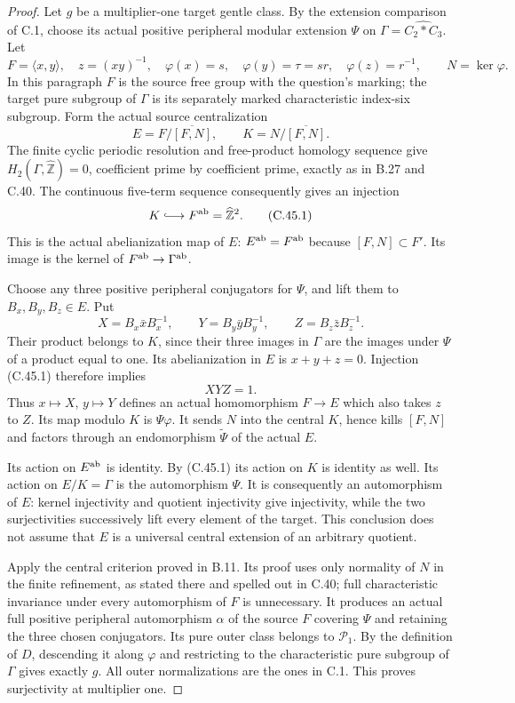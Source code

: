 \begin{proof}
Let $g$ be a multiplier-one target gentle class. By the extension
comparison of C.1, choose its actual positive peripheral modular
extension $\Psi$ on
$\Gamma=\widehat{C_2*C_3}$. Let
\[
 F=\langle x,y\rangle,\quad z=(xy)^{-1},\quad
 \varphi(x)=s,\quad\varphi(y)=\tau=sr,\quad
 \varphi(z)=r^{-1},\qquad N=\ker\varphi.
\]
In this paragraph $F$ is the source free group with the question's
marking; the target pure subgroup of $\Gamma$ is its separately
marked characteristic index-six subgroup. Form the actual source
centralization
\[
 E=F/\overline{[F,N]},\qquad
 K=N/\overline{[F,N]}.
\]
The finite cyclic periodic resolution and free-product homology
sequence give $H_2(\Gamma,\widehat{\mathbb Z})=0$, coefficient
prime by coefficient prime, exactly as in B.27 and C.40.
The continuous five-term sequence consequently gives an injection
\[
                  K\lhook\joinrel\longrightarrow
                       F^{\rm ab}=\widehat{\mathbb Z}^{2}.
                                                               \tag{C.45.1}
\]
This is the actual abelianization map of $E$:
$E^{\rm ab}=F^{\rm ab}$ because $[F,N]\subset F'$. Its image
is the kernel of $F^{\rm ab}\to\Gamma^{\rm ab}$.

Choose any three positive peripheral conjugators for $\Psi$,
and lift them to $B_x,B_y,B_z\in E$. Put
\[
 X=B_x\bar x B_x^{-1},\qquad
 Y=B_y\bar y B_y^{-1},\qquad
 Z=B_z\bar z B_z^{-1}.
\]
Their product belongs to $K$, since their three images in
$\Gamma$ are the images under $\Psi$ of a product equal to one.
Its abelianization in $E$ is $x+y+z=0$. Injection (C.45.1)
therefore implies
\[
                               XYZ=1.                 \tag{C.45.2}
\]
Thus $x\mapsto X$, $y\mapsto Y$ defines an actual homomorphism
$F\to E$ which also takes $z$ to $Z$. Its map modulo $K$ is
$\Psi\varphi$. It sends $N$ into the central $K$, hence kills
$[F,N]$ and factors through an endomorphism $\widetilde\Psi$ of
the actual $E$.

Its action on $E^{\rm ab}$ is identity. By (C.45.1) its action
on $K$ is identity as well. Its action on $E/K=\Gamma$ is the
automorphism $\Psi$. It is consequently an automorphism of $E$:
kernel injectivity and quotient injectivity give injectivity,
while the two surjectivities successively lift every element of
the target. This conclusion does not assume that $E$ is a universal
central extension of an arbitrary quotient.

Apply the central criterion proved in B.11. Its proof uses only
normality of $N$ in the finite refinement, as stated there and
spelled out in C.40; full characteristic invariance under every
automorphism of $F$ is unnecessary. It produces an actual full
positive peripheral automorphism $\alpha$ of the source $F$
covering $\Psi$ and retaining the three chosen conjugators.
Its pure outer class belongs to $\mathcal P_1$. By the definition
of $D$, descending it along $\varphi$ and restricting to the
characteristic pure subgroup of $\Gamma$ gives exactly $g$.
All outer normalizations are the ones in C.1. This proves
surjectivity at multiplier one.


\end{proof}
